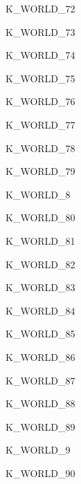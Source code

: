 \begin{datadesc}{K_WORLD_72}
\end{datadesc}
\begin{datadesc}{K_WORLD_73}
\end{datadesc}
\begin{datadesc}{K_WORLD_74}
\end{datadesc}
\begin{datadesc}{K_WORLD_75}
\end{datadesc}
\begin{datadesc}{K_WORLD_76}
\end{datadesc}
\begin{datadesc}{K_WORLD_77}
\end{datadesc}
\begin{datadesc}{K_WORLD_78}
\end{datadesc}
\begin{datadesc}{K_WORLD_79}
\end{datadesc}
\begin{datadesc}{K_WORLD_8}
\end{datadesc}
\begin{datadesc}{K_WORLD_80}
\end{datadesc}
\begin{datadesc}{K_WORLD_81}
\end{datadesc}
\begin{datadesc}{K_WORLD_82}
\end{datadesc}
\begin{datadesc}{K_WORLD_83}
\end{datadesc}
\begin{datadesc}{K_WORLD_84}
\end{datadesc}
\begin{datadesc}{K_WORLD_85}
\end{datadesc}
\begin{datadesc}{K_WORLD_86}
\end{datadesc}
\begin{datadesc}{K_WORLD_87}
\end{datadesc}
\begin{datadesc}{K_WORLD_88}
\end{datadesc}
\begin{datadesc}{K_WORLD_89}
\end{datadesc}
\begin{datadesc}{K_WORLD_9}
\end{datadesc}
\begin{datadesc}{K_WORLD_90}
\end{datadesc}
